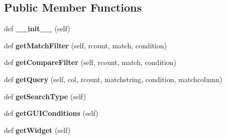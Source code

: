 \subsection*{Public Member Functions}
\begin{DoxyCompactItemize}
\item 
\mbox{\label{classdatatypes_1_1Governance__Change_1_1Governance__Change_a44125b63e7262d71eef7e799c8238da6}} 
def {\bfseries \+\_\+\+\_\+init\+\_\+\+\_\+} (self)
\item 
\mbox{\label{classdatatypes_1_1Governance__Change_1_1Governance__Change_aaed9590cf38bb4416028d161291cfc28}} 
def {\bfseries get\+Match\+Filter} (self, rcount, match, condition)
\item 
\mbox{\label{classdatatypes_1_1Governance__Change_1_1Governance__Change_ab89f578929f66aa3211963eb49e07caa}} 
def {\bfseries get\+Compare\+Filter} (self, rcount, match, condition)
\item 
\mbox{\label{classdatatypes_1_1Governance__Change_1_1Governance__Change_a7b2c5305821a91f6ba28908b1d394219}} 
def {\bfseries get\+Query} (self, col, rcount, matchstring, condition, matchcolumn)
\item 
\mbox{\label{classdatatypes_1_1Governance__Change_1_1Governance__Change_a3e8421e103e24befa9ffd4c1e1a9ba21}} 
def {\bfseries get\+Search\+Type} (self)
\item 
\mbox{\label{classdatatypes_1_1Governance__Change_1_1Governance__Change_abb9fcfb66eac7dafc8fd3a23420dceeb}} 
def {\bfseries get\+G\+U\+I\+Conditions} (self)
\item 
\mbox{\label{classdatatypes_1_1Governance__Change_1_1Governance__Change_acd39dc372ead07e03b7460bcb8a810a9}} 
def {\bfseries get\+Widget} (self)
\item 
\mbox{\label{classdatatypes_1_1Governance__Change_1_1Governance__Change_a3447cdc57622dfbbfcd1e779c1557fde}} 

\end{DoxyCompactItemize}
